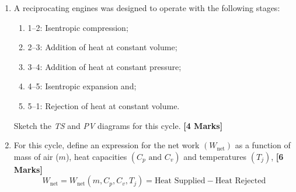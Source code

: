 \documentclass[calculator,steamtables,refrigeranttables]{exam}
\begin{document}
\clearpage


\begin{question}\vspace{-2\baselineskip}
\begin{enumerate}
%
\item A reciprocating engines was designed to operate with the following stages:
\begin{enumerate}
\item 1--2: Isentropic compression;
\item 2--3: Addition of heat at constant volume;
\item 3--4: Addition of heat at constant pressure;
\item 4--5: Isentropic expansion and;
\item 5--1: Rejection of heat at constant volume.
\end{enumerate}
Sketch the {\it TS} and {\it PV} diagrams for this cycle. {\bf[4 Marks]}
%
\item For this cycle, define an expression for the net work $\left(W_{\text{net}}\right)$ as a function of mass of air ($m$), heat capacities $\left(C_{p}\text{ and } C_{v}\right)$ and temperatures $\left(T_{j}\right)$, {\bf[6 Marks]}
\begin{displaymath}
W_{\text{net}}= W_{\text{net}}\left(m,C_{p},C_{v},T_{j}\right)=\text{Heat Supplied} - \text{Heat Rejected}
\end{displaymath}


%
\end{enumerate}

\end{question}



\vfill

\paperend
\end{document}
